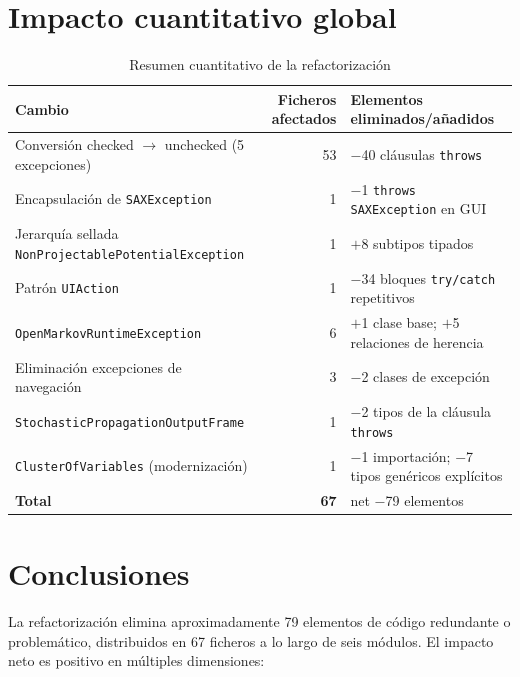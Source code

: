 \documentclass[12pt,a4paper]{article}
\begin{document}
\section{Impacto cuantitativo global}
\label{sec:impacto}

\begin{table}[H]
\centering
\begin{tabularx}{\textwidth}{p{6.5cm}rX}
\toprule
Cambio & Ficheros afectados & Elementos eliminados/añadidos \\
\midrule
Conversión checked $\to$ unchecked (5 excepciones) & 53 & $-$40 cláusulas \texttt{throws} \\
Encapsulación de \texttt{SAXException} &  1 & $-$1 \texttt{throws SAXException} en GUI \\
Jerarquía sellada \texttt{NonProjectablePotentialException} & 1 & $+$8 subtipos tipados \\
Patrón \texttt{UIAction} &  1 & $-$34 bloques \texttt{try/catch} repetitivos \\
\texttt{OpenMarkovRuntimeException} &  6 & $+$1 clase base; $+$5 relaciones de herencia \\
Eliminación excepciones de navegación &  3 & $-$2 clases de excepción \\
\texttt{StochasticPropagationOutputFrame} &  1 & $-$2 tipos de la cláusula \texttt{throws} \\
\texttt{ClusterOfVariables} (modernización) &  1 & $-$1 importación; $-$7 tipos genéricos explícitos \\
\midrule
\textbf{Total} & \textbf{67} & net $-$79 elementos \\
\bottomrule
\end{tabularx}
\caption{Resumen cuantitativo de la refactorización}
\label{tab:impacto}
\end{table}

\section{Conclusiones}
\label{sec:conclusiones}

La refactorización elimina aproximadamente 79 elementos de código redundante o
problemático, distribuidos en 67 ficheros a lo largo de seis módulos. El impacto
neto es positivo en múltiples dimensiones:
\end{document}
